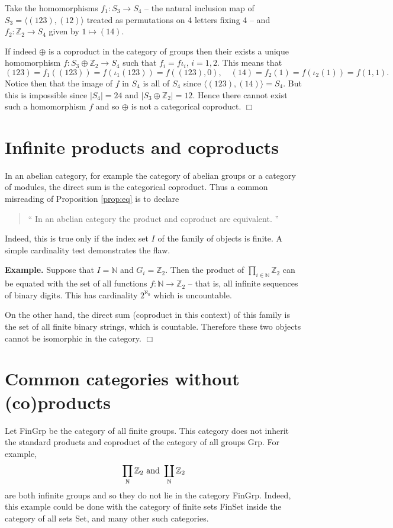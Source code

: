 \documentclass[12pt]{article}
\begin{document}
Take the homomorphisms $f_1:S_3\rightarrow S_4$ -- the
natural inclusion map of $S_3=\langle (123),(12)\rangle$ treated as permutations on 4 letters fixing 4 -- and $f_2:\mathbb{Z}_2\rightarrow S_4$
given by $1\mapsto (14)$.

If indeed $\oplus$ is a coproduct in the category of groups then their exists
a unique homomorphism $f:S_3\oplus \mathbb{Z}_2\rightarrow S_4$ such that
$f_i=f\iota_i$, $i=1,2$.  This means that
\[(123)=f_1((123))=f(\iota_1(123))=f((123),0),
\quad
(14)=f_2(1)=f(\iota_2(1))=f(1,1).\]
Notice then that the image of $f$ in $S_4$ is all of $S_4$ since $\langle(123),(14)\rangle=S_4$.  But this is impossible since $|S_4|=24$ and
$|S_3\oplus \mathbb{Z}_2|=12$.  Hence there cannot exist such a homomorphism
$f$ and so $\oplus$ is not a categorical coproduct.
$\Box$

\section{Infinite products and coproducts}

In an abelian category, for example the category of abelian groups or a category of modules, the direct sum is the categorical coproduct.  Thus a common 
misreading of Proposition \ref{prop:eq} is to declare
\begin{quote}
`` In an abelian category the product and coproduct are equivalent. ''
\end{quote}
Indeed, this is true only if the index set $I$ of the family of objects is finite.  A simple cardinality test demonstrates the flaw.

\textbf{Example.}  Suppose that $I=\mathbb{N}$ and $G_i=\mathbb{Z}_2$.
Then the product of $\prod_{i\in \mathbb{N}} \mathbb{Z}_2$ can be equated
with the set of all functions $f:\mathbb{N}\rightarrow \mathbb{Z}_2$ -- that is, all infinite sequences of binary digits.  This has cardinality $2^{\aleph_0}$ which is uncountable.

On the other hand, the direct sum (coproduct in this context) of this family is the set of all finite binary strings, which is countable.  Therefore these two objects cannot be isomorphic in the category. $\Box$

\section{Common categories without (co)products}

Let \textsf{FinGrp} be the category of all finite groups.  This category does not inherit the standard products and coproduct of the category of all groups \textsf{Grp}.  For example, 
\[\prod_{\mathbb{N}} \mathbb{Z}_2\textnormal{ and }\coprod_{\mathbb{N}} \mathbb{Z}_2\]
are both infinite groups and so they do not lie in the category \textsf{FinGrp}.
Indeed, this example could be done with the category of finite sets \textsf{FinSet} inside the category of all sets \textsf{Set}, and many other such categories.
\end{document}

